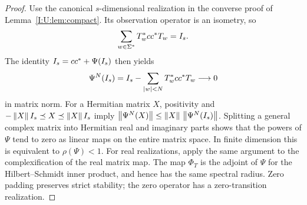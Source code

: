 \begin{proof}
Use the canonical $s$-dimensional realization in the converse proof of Lemma~\ref{I:U:lem:compact}. Its observation operator is an isometry, so
\[
 \sum_{w\in\Sigma^*}T_w^*cc^*T_w=I_s.
\]
The identity $I_s=cc^*+\Psi(I_s)$ then yields
\[
 \Psi^N(I_s)=I_s-\sum_{|w|<N}T_w^*cc^*T_w\longrightarrow0
\]
in matrix norm. For a Hermitian matrix $X$, positivity and
$-\left\lVert X\right\rVert I_s\preceq X\preceq\left\lVert X\right\rVert I_s$ imply
$\left\lVert\Psi^N(X)\right\rVert\le\left\lVert X\right\rVert\,\left\lVert\Psi^N(I_s)\right\rVert$.
Splitting a general complex matrix into Hermitian real and imaginary parts shows that the powers of $\Psi$ tend to zero as linear maps on the entire matrix space. In finite dimension this is equivalent to $\rho(\Psi)<1$.
For real realizations, apply the same argument to the complexification of the real matrix map.
The map $\Phi_T$ is the adjoint of $\Psi$ for the Hilbert--Schmidt inner product, and hence has the same spectral radius. Zero padding preserves strict stability; the zero operator has a zero-transition realization.
\end{proof}
